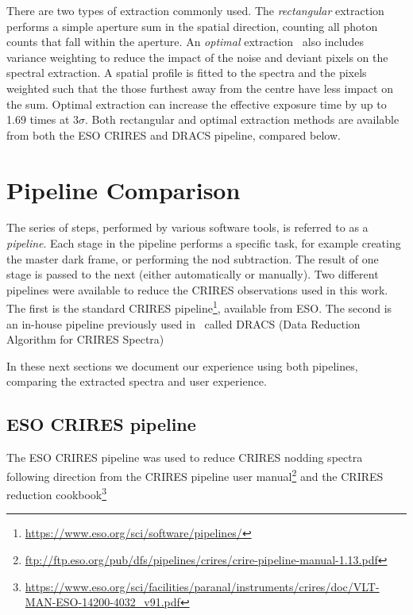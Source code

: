 There are two types of extraction commonly used. The \emph{rectangular} extraction performs a simple aperture sum in the spatial direction, counting all photon counts that fall within the aperture. An \emph{optimal} extraction~\citep{horne_optimal_1986} also includes variance weighting to reduce the impact of the noise and deviant pixels on the spectral extraction. A spatial profile is fitted to the spectra and the pixels weighted such that the those furthest away from the centre have less impact on the sum. Optimal extraction can increase the effective exposure time by up to 1.69 times at \(3 \sigma\)\citep{horne_optimal_1986}. Both rectangular and optimal extraction methods are available from both the {ESO} {CRIRES} and {DRACS} pipeline, compared below.

\section{Pipeline Comparison}
\label{sec:pipelines}
 The series of steps, performed by various software tools, is referred to as a \emph{pipeline}. Each stage in the pipeline performs a specific task, for example creating the master dark frame, or performing the nod subtraction. The result of one stage is passed to the next (either automatically or manually). Two different pipelines were available to reduce the {CRIRES} observations used in this work. The first is the standard {CRIRES} pipeline\footnote{\href{https://www.eso.org/sci/software/pipelines/}{https://www.eso.org/sci/software/pipelines/}}, available from {ESO}.
The second is an in-house pipeline previously used in~\citet{figueira_radial_2010} called {DRACS} (Data Reduction Algorithm for {CRIRES} Spectra) 

In these next sections we document our experience using both pipelines, comparing the extracted spectra and user experience.


\subsection{{ESO} {CRIRES} pipeline}
\label{subsec:eso-crires}
The {ESO} {CRIRES} pipeline was used to reduce {CRIRES} nodding spectra following direction from the {CRIRES} pipeline user manual\footnote{\href{ftp://ftp.eso.org/pub/dfs/pipelines/crires/crire-pipeline-manual-1.13.pdf}{ftp://ftp.eso.org/pub/dfs/pipelines/crires/crire-pipeline-manual-1.13.pdf}} and the {CRIRES} reduction cookbook\footnote{\href{https://www.eso.org/sci/facilities/paranal/instruments/crires/doc/VLT-MAN-{ESO}-14200-4032\_v91.pdf}{https://www.eso.org/sci/facilities/paranal/instruments/crires/doc/VLT-MAN-{ESO}-14200-4032\_v91.pdf}}

